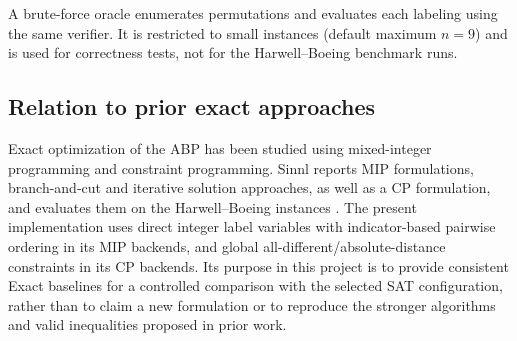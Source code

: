 A brute-force oracle enumerates permutations and evaluates each labeling using the same verifier. It is restricted to small instances (default maximum $n=9$) and is used for correctness tests, not for the Harwell--Boeing benchmark runs.

\subsection{Relation to prior exact approaches}
Exact optimization of the ABP has been studied using mixed-integer programming and constraint programming. Sinnl reports MIP formulations, branch-and-cut and iterative solution approaches, as well as a CP formulation, and evaluates them on the Harwell--Boeing instances \citep{Sinnl2021}. The present implementation uses direct integer label variables with indicator-based pairwise ordering in its MIP backends, and global all-different/absolute-distance constraints in its CP backends. Its purpose in this project is to provide consistent Exact baselines for a controlled comparison with the selected SAT configuration, rather than to claim a new formulation or to reproduce the stronger algorithms and valid inequalities proposed in prior work.
